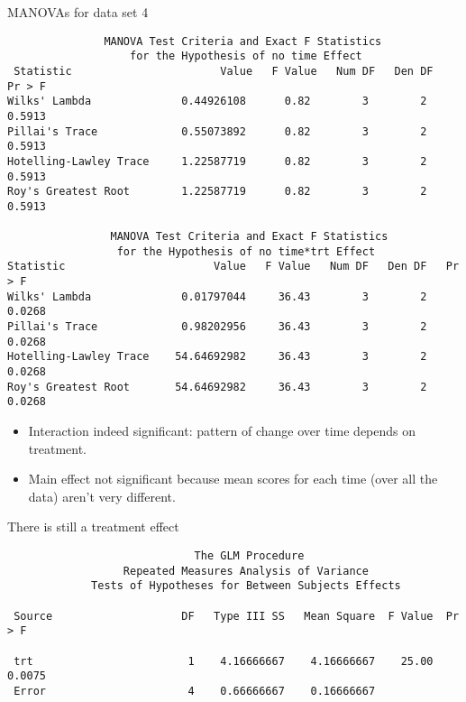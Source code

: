 \documentclass[pdf]{prosper}
\begin{document}
  \begin{slide}{MANOVAs for data set 4}

{\scriptsize
\begin{verbatim}
               MANOVA Test Criteria and Exact F Statistics
                   for the Hypothesis of no time Effect
 Statistic                       Value   F Value   Num DF   Den DF   Pr > F
Wilks' Lambda              0.44926108      0.82        3        2   0.5913
Pillai's Trace             0.55073892      0.82        3        2   0.5913
Hotelling-Lawley Trace     1.22587719      0.82        3        2   0.5913
Roy's Greatest Root        1.22587719      0.82        3        2   0.5913

                MANOVA Test Criteria and Exact F Statistics
                 for the Hypothesis of no time*trt Effect
Statistic                       Value   F Value   Num DF   Den DF   Pr > F
Wilks' Lambda              0.01797044     36.43        3        2   0.0268
Pillai's Trace             0.98202956     36.43        3        2   0.0268
Hotelling-Lawley Trace    54.64692982     36.43        3        2   0.0268
Roy's Greatest Root       54.64692982     36.43        3        2   0.0268

\end{verbatim}
}

\begin{itemize}
\item Interaction indeed significant: pattern of change over time depends on treatment.
\item Main effect not significant because mean scores for each time (over all the data) aren't very different.
\end{itemize}
    
  \end{slide}


  \begin{slide}{There is still a treatment effect}

{\scriptsize
\begin{verbatim}
                             The GLM Procedure
                  Repeated Measures Analysis of Variance
             Tests of Hypotheses for Between Subjects Effects

 Source                    DF   Type III SS   Mean Square  F Value  Pr > F

 trt                        1    4.16666667    4.16666667    25.00  0.0075
 Error                      4    0.66666667    0.16666667                 

\end{verbatim}
}

\end{slide}
\end{document}
